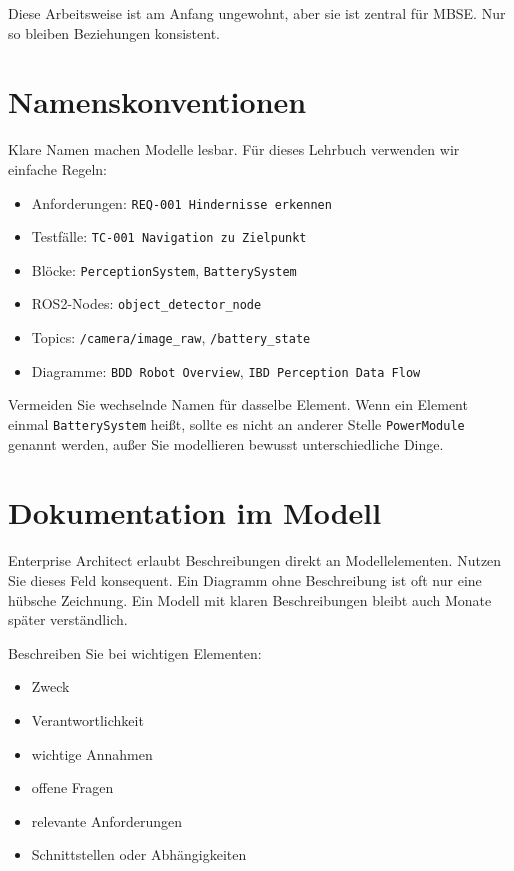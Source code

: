 Diese Arbeitsweise ist am Anfang ungewohnt, aber sie ist zentral für MBSE. Nur so bleiben Beziehungen konsistent.

\section{Namenskonventionen}
Klare Namen machen Modelle lesbar. Für dieses Lehrbuch verwenden wir einfache Regeln:

\begin{itemize}
    \item Anforderungen: \texttt{REQ-001 Hindernisse erkennen}
    \item Testfälle: \texttt{TC-001 Navigation zu Zielpunkt}
    \item Blöcke: \texttt{PerceptionSystem}, \texttt{BatterySystem}
    \item ROS2-Nodes: \texttt{object\_detector\_node}
    \item Topics: \texttt{/camera/image\_raw}, \texttt{/battery\_state}
    \item Diagramme: \texttt{BDD Robot Overview}, \texttt{IBD Perception Data Flow}
\end{itemize}

Vermeiden Sie wechselnde Namen für dasselbe Element. Wenn ein Element einmal \texttt{BatterySystem} heißt, sollte es nicht an anderer Stelle \texttt{PowerModule} genannt werden, außer Sie modellieren bewusst unterschiedliche Dinge.

\section{Dokumentation im Modell}
Enterprise Architect erlaubt Beschreibungen direkt an Modellelementen. Nutzen Sie dieses Feld konsequent. Ein Diagramm ohne Beschreibung ist oft nur eine hübsche Zeichnung. Ein Modell mit klaren Beschreibungen bleibt auch Monate später verständlich.

Beschreiben Sie bei wichtigen Elementen:

\begin{itemize}
    \item Zweck
    \item Verantwortlichkeit
    \item wichtige Annahmen
    \item offene Fragen
    \item relevante Anforderungen
    \item Schnittstellen oder Abhängigkeiten
\end{itemize}

